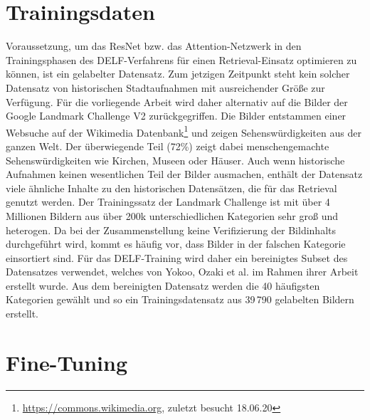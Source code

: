 \section{Trainingsdaten}\label{trainingsdata}
Voraussetzung, um das ResNet bzw. das Attention-Netzwerk in den Trainingsphasen des DELF-Verfahrens für einen Retrieval-Einsatz optimieren zu können, ist ein gelabelter Datensatz. Zum jetzigen Zeitpunkt steht kein solcher Datensatz von historischen Stadtaufnahmen mit ausreichender Größe zur Verfügung. Für die vorliegende Arbeit wird daher alternativ auf die Bilder der Google Landmark Challenge V2 \cite{landmarks_v2} zurückgegriffen. Die Bilder entstammen einer Websuche auf der Wikimedia Datenbank\footnote{\url{https://commons.wikimedia.org}, zuletzt besucht 18.06.20} und zeigen Sehenswürdigkeiten aus der ganzen Welt. Der überwiegende Teil (72\%) zeigt dabei menschengemachte Sehenswürdigkeiten wie Kirchen, Museen oder Häuser. Auch wenn historische Aufnahmen keinen wesentlichen Teil der Bilder ausmachen, enthält der Datensatz viele ähnliche Inhalte zu den historischen Datensätzen, die für das Retrieval genutzt werden. Der Trainingssatz der Landmark Challenge ist mit über 4 Millionen Bildern aus über 200k unterschiedlichen Kategorien sehr groß und heterogen. Da bei der Zusammenstellung keine Verifizierung der Bildinhalts durchgeführt wird, kommt es häufig vor, dass Bilder in der falschen Kategorie einsortiert sind. Für das DELF-Training wird daher ein bereinigtes Subset des Datensatzes verwendet, welches von Yokoo, Ozaki et al. im Rahmen ihrer Arbeit \cite{landmarks_verified} erstellt wurde. Aus dem bereinigten Datensatz werden die 40 häufigsten Kategorien gewählt und so ein Trainingsdatensatz aus 39\,790 gelabelten Bildern erstellt. 

\section{Fine-Tuning}

